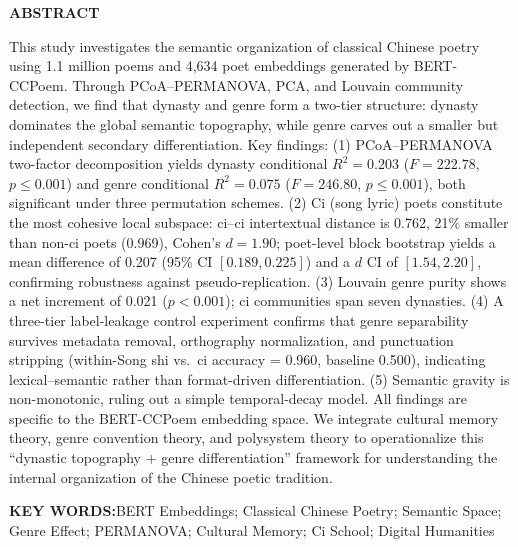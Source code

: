 \documentclass[12pt,a4paper]{article}
\numberwithin{equation}{section}
\begin{document}
\begin{center}
  {\bfseries\fontsize{14}{20}\selectfont ABSTRACT\par}
  \vspace{0.4em}
  \parbox{0.92\linewidth}{\fontsize{10.5}{14}\selectfont%
    This study investigates the semantic organization of classical Chinese poetry using 1.1 million poems and 4,634 poet embeddings generated by BERT-CCPoem. Through PCoA--PERMANOVA, PCA, and Louvain community detection, we find that dynasty and genre form a two-tier structure: dynasty dominates the global semantic topography, while genre carves out a smaller but independent secondary differentiation. Key findings: (1) PCoA--PERMANOVA two-factor decomposition yields dynasty conditional $R^{2}=0.203$ ($F=222.78$, $p\leq0.001$) and genre conditional $R^{2}=0.075$ ($F=246.80$, $p\leq0.001$), both significant under three permutation schemes. (2) Ci (song lyric) poets constitute the most cohesive local subspace: ci--ci intertextual distance is 0.762, 21\% smaller than non-ci poets (0.969), Cohen's $d=1.90$; poet-level block bootstrap yields a mean difference of 0.207 (95\% CI $[0.189,0.225]$) and a $d$ CI of $[1.54,2.20]$, confirming robustness against pseudo-replication. (3) Louvain genre purity shows a net increment of 0.021 ($p<0.001$); ci communities span seven dynasties. (4) A three-tier label-leakage control experiment confirms that genre separability survives metadata removal, orthography normalization, and punctuation stripping (within-Song shi vs.\ ci accuracy = 0.960, baseline 0.500), indicating lexical--semantic rather than format-driven differentiation. (5) Semantic gravity is non-monotonic, ruling out a simple temporal-decay model. All findings are specific to the BERT-CCPoem embedding space. We integrate cultural memory theory, genre convention theory, and polysystem theory to operationalize this ``dynastic topography + genre differentiation'' framework for understanding the internal organization of the Chinese poetic tradition.\par}
  \vspace{0.5em}

  {\bfseries\fontsize{10.5}{14}\selectfont KEY WORDS:}\fontsize{10.5}{14}\selectfont BERT Embeddings; Classical Chinese Poetry; Semantic Space; Genre Effect; PERMANOVA; Cultural Memory; Ci School; Digital Humanities
\end{center}

\vspace{0.5cm}

\newpage
\end{document}
